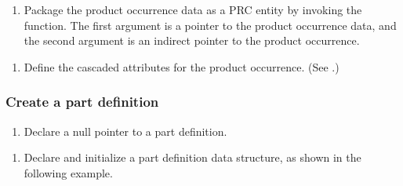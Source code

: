 \documentclass[letterpaper,12pt,english,openany,oneside]{sphinxmanual}
\begin{document}
\begin{sphinxVerbatim}[commandchars=\\\{\}]
 
  
\end{sphinxVerbatim}
\begin{enumerate}
%
\setcounter{enumi}{3}
\item {} 
Package the product occurrence data as a PRC entity by invoking the  function. The first argument is a pointer to the product occurrence data, and the second argument is an indirect pointer to the product occurrence.

\end{enumerate}

\begin{sphinxVerbatim}[commandchars=\\\{\}]
  
   
\end{sphinxVerbatim}
\begin{enumerate}
%
\setcounter{enumi}{4}
\item {} 
Define the cascaded attributes for the product occurrence. (See .)

\end{enumerate}


\subsubsection{Create a part definition}
\label{\detokenize{Plugins_A3D_API:create-a-part-definition}}\begin{enumerate}
%
\item {} 
Declare a null pointer to a part definition.

\end{enumerate}

\begin{sphinxVerbatim}[commandchars=\\\{\}]
   
\end{sphinxVerbatim}
\begin{enumerate}
%
\setcounter{enumi}{1}
\item {} 
Declare and initialize a part definition data structure, as shown in the following example.

\end{enumerate}
\end{document}
